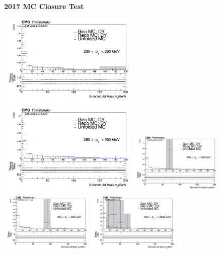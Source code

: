 \documentclass{beamer}
\begin{document}
\begin{frame}{\textbf{2017 MC Closure Test}}

\includegraphics[width=0.5\textwidth]{Jun25_unfoldPlots_sdB0/Output_NoReg_MC_ptbin1MC_mass_Ptbin200to260_Detbinning_Groomingis_sdB0.png}%
\includegraphics[width=0.5\textwidth]{Jun25_unfoldPlots_sdB0/Output_NoReg_MC_ptbin2MC_mass_Ptbin260to350_Detbinning_Groomingis_sdB0.png}
\newline
\includegraphics[width=0.3333\textwidth]{Jun25_unfoldPlots_sdB0/Output_NoReg_MC_ptbin3MC_mass_Ptbin350to460_Detbinning_Groomingis_sdB0.png}%
\includegraphics[width=0.3333\textwidth]{Jun25_unfoldPlots_sdB0/Output_NoReg_MC_ptbin4MC_mass_Ptbin460to550_Detbinning_Groomingis_sdB0.png}
\includegraphics[width=0.3333\textwidth]{Jun25_unfoldPlots_sdB0/Output_NoReg_MC_ptbin5MC_mass_Ptbin550to13000_Detbinning_Groomingis_sdB0.png}





\end{frame}
\end{document}

